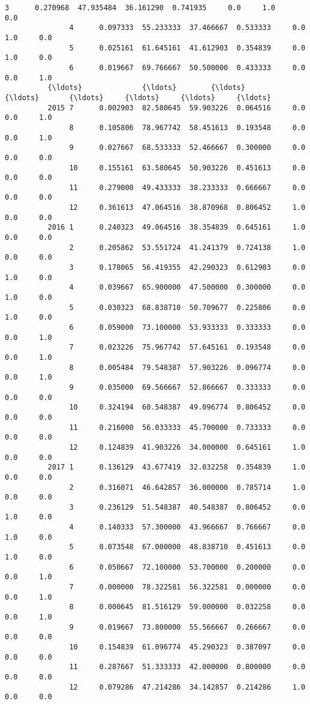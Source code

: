 \documentclass[11pt]{article}
\begin{document}
\begin{Verbatim}[commandchars=\\\{\}]
               3      0.270968  47.935484  36.161290  0.741935     0.0     1.0     0.0   
               4      0.097333  55.233333  37.466667  0.533333     0.0     1.0     0.0   
               5      0.025161  61.645161  41.612903  0.354839     0.0     1.0     0.0   
               6      0.019667  69.766667  50.500000  0.433333     0.0     0.0     1.0   
          {\ldots}              {\ldots}        {\ldots}        {\ldots}       {\ldots}     {\ldots}     {\ldots}     {\ldots}   
          2015 7      0.002903  82.580645  59.903226  0.064516     0.0     0.0     1.0   
               8      0.105806  78.967742  58.451613  0.193548     0.0     0.0     1.0   
               9      0.027667  68.533333  52.466667  0.300000     0.0     0.0     0.0   
               10     0.155161  63.580645  50.903226  0.451613     0.0     0.0     0.0   
               11     0.279000  49.433333  38.233333  0.666667     0.0     0.0     0.0   
               12     0.361613  47.064516  38.870968  0.806452     1.0     0.0     0.0   
          2016 1      0.240323  49.064516  38.354839  0.645161     1.0     0.0     0.0   
               2      0.205862  53.551724  41.241379  0.724138     1.0     0.0     0.0   
               3      0.178065  56.419355  42.290323  0.612903     0.0     1.0     0.0   
               4      0.039667  65.900000  47.500000  0.300000     0.0     1.0     0.0   
               5      0.030323  68.838710  50.709677  0.225806     0.0     1.0     0.0   
               6      0.059000  73.100000  53.933333  0.333333     0.0     0.0     1.0   
               7      0.023226  75.967742  57.645161  0.193548     0.0     0.0     1.0   
               8      0.005484  79.548387  57.903226  0.096774     0.0     0.0     1.0   
               9      0.035000  69.566667  52.866667  0.333333     0.0     0.0     0.0   
               10     0.324194  60.548387  49.096774  0.806452     0.0     0.0     0.0   
               11     0.216000  56.033333  45.700000  0.733333     0.0     0.0     0.0   
               12     0.124839  41.903226  34.000000  0.645161     1.0     0.0     0.0   
          2017 1      0.136129  43.677419  32.032258  0.354839     1.0     0.0     0.0   
               2      0.316071  46.642857  36.000000  0.785714     1.0     0.0     0.0   
               3      0.236129  51.548387  40.548387  0.806452     0.0     1.0     0.0   
               4      0.140333  57.300000  43.966667  0.766667     0.0     1.0     0.0   
               5      0.073548  67.000000  48.838710  0.451613     0.0     1.0     0.0   
               6      0.050667  72.100000  53.700000  0.200000     0.0     0.0     1.0   
               7      0.000000  78.322581  56.322581  0.000000     0.0     0.0     1.0   
               8      0.000645  81.516129  59.000000  0.032258     0.0     0.0     1.0   
               9      0.019667  73.800000  55.566667  0.266667     0.0     0.0     0.0   
               10     0.154839  61.096774  45.290323  0.387097     0.0     0.0     0.0   
               11     0.287667  51.333333  42.000000  0.800000     0.0     0.0     0.0   
               12     0.079286  47.214286  34.142857  0.214286     1.0     0.0     0.0   
          

\end{Verbatim}
\end{document}
